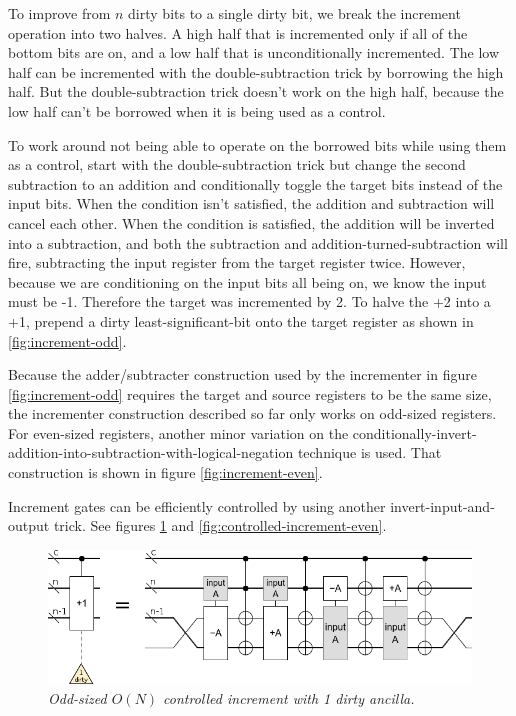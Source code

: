 \documentclass[twocolumn]{article}
\begin{document}
To improve from $n$ dirty bits to a single dirty bit, we break the increment operation into two halves.
A high half that is incremented only if all of the bottom bits are on, and a low half that is unconditionally incremented.
The low half can be incremented with the double-subtraction trick by borrowing the high half.
But the double-subtraction trick doesn't work on the high half, because the low half can't be borrowed when it is being used as a control.

To work around not being able to operate on the borrowed bits while using them as a control, start with the double-subtraction trick but change the second subtraction to an addition and conditionally toggle the target bits instead of the input bits.
When the condition isn't satisfied, the addition and subtraction will cancel each other.
When the condition is satisfied, the addition will be inverted into a subtraction, and both the subtraction and addition-turned-subtraction will fire, subtracting the input register from the target register twice.
However, because we are conditioning on the input bits all being on, we know the input must be -1.
Therefore the target was incremented by 2.
To halve the +2 into a +1, prepend a dirty least-significant-bit onto the target register as shown in \ref{fig:increment-odd}.

Because the adder/subtracter construction used by the incrementer in figure \ref{fig:increment-odd} requires the target and source registers to be the same size, the incrementer construction described so far only works on odd-sized registers.
For even-sized registers, another minor variation on the conditionally-invert-addition-into-subtraction-with-logical-negation technique is used.
That construction is shown in figure \ref{fig:increment-even}.

Increment gates can be efficiently controlled by using another invert-input-and-output trick.
See figures \ref{fig:controlled-increment-odd} and \ref{fig:controlled-increment-even}.

\begin{figure}
  \centering
  \includegraphics[width=\linewidth]{assets/controlled-increment-odd.png}
  \caption{\em Odd-sized $O(N)$ controlled increment with 1 dirty ancilla.}
  \label{fig:controlled-increment-odd}
\end{figure}
\end{document}
